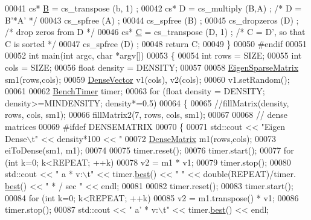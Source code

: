 \begin{DoxyCode}
00041   cs* \hyperlink{group___core___module_class_eigen_1_1_matrix}{B} = cs\_transpose (b, 1) ;
00042   cs* D = cs\_multiply (B,A) ;   \textcolor{comment}{/* D = B'*A' */}
00043   cs\_spfree (A) ;
00044   cs\_spfree (B) ;
00045   cs\_dropzeros (D) ;      \textcolor{comment}{/* drop zeros from D */}
00046   cs* \hyperlink{group___core___module}{C} = cs\_transpose (D, 1) ;   \textcolor{comment}{/* C = D', so that C is sorted */}
00047   cs\_spfree (D) ;
00048   \textcolor{keywordflow}{return} C;
00049 \}
00050 \textcolor{preprocessor}{#endif}
00051 
00052 \textcolor{keywordtype}{int} main(\textcolor{keywordtype}{int} argc, \textcolor{keywordtype}{char} *argv[])
00053 \{
00054   \textcolor{keywordtype}{int} rows = SIZE;
00055   \textcolor{keywordtype}{int} cols = SIZE;
00056   \textcolor{keywordtype}{float} density = DENSITY;
00057 
00058   \hyperlink{group___sparse_core___module}{EigenSparseMatrix} sm1(rows,cols);
00059   \hyperlink{group___core___module}{DenseVector} v1(cols), v2(cols);
00060   v1.setRandom();
00061 
00062   \hyperlink{class_eigen_1_1_bench_timer}{BenchTimer} timer;
00063   \textcolor{keywordflow}{for} (\textcolor{keywordtype}{float} density = DENSITY; density>=MINDENSITY; density*=0.5)
00064   \{
00065     \textcolor{comment}{//fillMatrix(density, rows, cols, sm1);}
00066     fillMatrix2(7, rows, cols, sm1);
00067 
00068     \textcolor{comment}{// dense matrices}
00069 \textcolor{preprocessor}{    #ifdef DENSEMATRIX}
00070     \{
00071       std::cout << \textcolor{stringliteral}{"Eigen Dense\(\backslash\)t"} << density*100 << \textcolor{stringliteral}{"%
00072       \hyperlink{group___core___module}{DenseMatrix} m1(rows,cols);
00073       eiToDense(sm1, m1);
00074 
00075       timer.reset();
00076       timer.start();
00077       \textcolor{keywordflow}{for} (\textcolor{keywordtype}{int} k=0; k<REPEAT; ++k)
00078         v2 = m1 * v1;
00079       timer.stop();
00080       std::cout << \textcolor{stringliteral}{"   a * v:\(\backslash\)t"} << timer.\hyperlink{class_eigen_1_1_bench_timer_ae8b673b0fa356d3432c7a65c79e8af0e}{best}() << \textcolor{stringliteral}{"  "} << double(REPEAT)/timer.
      \hyperlink{class_eigen_1_1_bench_timer_ae8b673b0fa356d3432c7a65c79e8af0e}{best}() << \textcolor{stringliteral}{" * / sec "} << endl;
00081 
00082       timer.reset();
00083       timer.start();
00084       \textcolor{keywordflow}{for} (\textcolor{keywordtype}{int} k=0; k<REPEAT; ++k)
00085         v2 = m1.transpose() * v1;
00086       timer.stop();
00087       std::cout << \textcolor{stringliteral}{"   a' * v:\(\backslash\)t"} << timer.\hyperlink{class_eigen_1_1_bench_timer_ae8b673b0fa356d3432c7a65c79e8af0e}{best}() << endl;
}
\end{DoxyCode}

